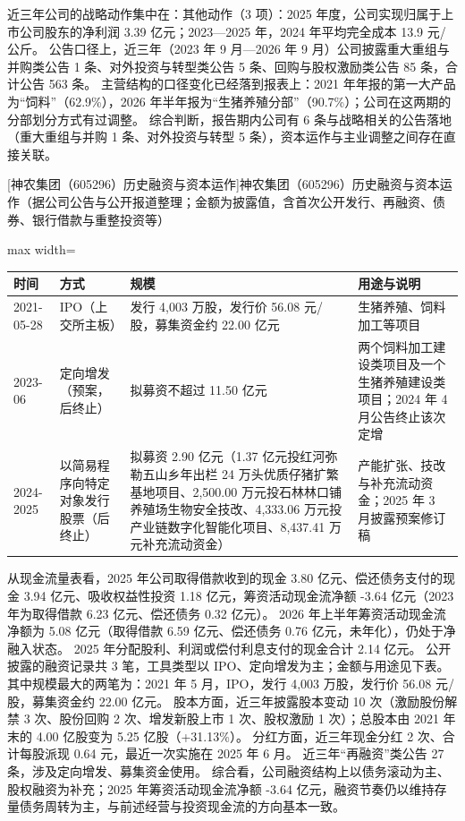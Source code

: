  近三年公司的战略动作集中在：其他动作（3 项）：2025 年度，公司实现归属于上市公司股东的净利润 3.39 亿元；2023---2025 年，2024 年平均完全成本 13.9 元/公斤。 公告口径上，近三年（2023 年 9 月---2026 年 9 月）公司披露重大重组与并购类公告 1 条、对外投资与转型类公告 5 条、回购与股权激励类公告 85 条，合计公告 563 条。 主营结构的口径变化已经落到报表上：2021 年年报的第一大产品为“饲料”（62.9\%），2026 年半年报为“生猪养殖分部”（90.7\%）；公司在这两期的分部划分方式有过调整。 综合判断，报告期内公司有 6 条与战略相关的公告落地（重大重组与并购 1 条、对外投资与转型 5 条），资本运作与主业调整之间存在直接关联。

\begin{center}\small\setlength{\tabcolsep}{4pt}
[神农集团（605296）历史融资与资本运作]{神农集团（605296）历史融资与资本运作（据公司公告与公开报道整理；金额为披露值，含首次公开发行、再融资、债券、银行借款与重整投资等）}
\begin{adjustbox}{max width=\textwidth}
\begin{tabular}{@{}p{1.45cm}p{2.55cm}p{4.05cm}p{4.95cm}@{}}
\toprule
时间 & 方式 & 规模 & 用途与说明 \\
\midrule
2021-05-28 & IPO（上交所主板） & 发行 4,\allowbreak{}003 万股，\allowbreak{}发行价 56.08 元/\allowbreak{}股，\allowbreak{}募集资金约 22.00 亿元 & 生猪养殖、\allowbreak{}饲料加工等项目 \\
2023-06 & 定向增发（预案，后终止） & 拟募资不超过 11.50 亿元 & 两个饲料加工建设类项目及一个生猪养殖建设类项目；2024 年 4 月公告终止该次定增 \\
2024-2025 & 以简易程序向特定对象发行股票（后终止） & 拟募资 2.90 亿元（1.37 亿元投红河弥勒五山乡年出栏 24 万头优质仔猪扩繁基地项目、\allowbreak{}2,\allowbreak{}500.00 万元投石林林口铺养殖场生物安全技改、\allowbreak{}4,\allowbreak{}333.06 万元投产业链数字化智能化项目、\allowbreak{}8,\allowbreak{}437.41 万元补充流动资金） & 产能扩张、\allowbreak{}技改与补充流动资金；2025 年 3 月披露预案修订稿 \\
\bottomrule
\end{tabular}
\end{adjustbox}
\end{center}

 从现金流量表看，2025 年公司取得借款收到的现金 3.80 亿元、偿还债务支付的现金 3.94 亿元、吸收权益性投资 1.18 亿元，筹资活动现金流净额 -3.64 亿元（2023 年为取得借款 6.23 亿元、偿还债务 0.32 亿元）。 2026 年上半年筹资活动现金流净额为 5.08 亿元（取得借款 6.59 亿元、偿还债务 0.76 亿元，未年化），仍处于净融入状态。 2025 年分配股利、利润或偿付利息支付的现金合计 2.14 亿元。 公开披露的融资记录共 3 笔，工具类型以 IPO、定向增发为主；金额与用途见下表。 其中规模最大的两笔为：2021 年 5 月，IPO，发行 4,003 万股，发行价 56.08 元/股，募集资金约 22.00 亿元。 股本方面，近三年披露股本变动 10 次（激励股份解禁 3 次、股份回购 2 次、增发新股上市 1 次、股权激励 1 次）；总股本由 2021 年末的 4.00 亿股变为 5.25 亿股（+31.13\%）。 分红方面，近三年现金分红 2 次、合计每股派现 0.64 元，最近一次实施在 2025 年 6 月。 近三年“再融资”类公告 27 条，涉及定向增发、募集资金使用。 综合看，公司融资结构上以债务滚动为主、股权融资为补充；2025 年筹资活动现金流净额 -3.64 亿元，融资节奏仍以维持存量债务周转为主，与前述经营与投资现金流的方向基本一致。

